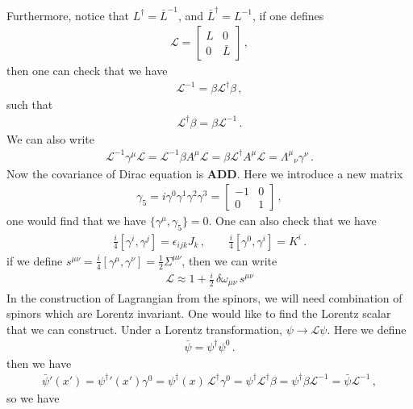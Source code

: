 \documentclass[11pt, onesided]{book}
\theoremstyle{break}
\theoremstyle{break}
\newcommand{\bmat}[1]{\begin{bmatrix} #1 \end{bmatrix}}
\begin{document}
Furthermore, notice that $L^\dagger = \bar{L}^{-1}$, and $\bar{L}^{\dagger} = L^{-1}$, if one defines
\begin{align*}
\mathcal{L} = \bmat{L & 0 \\ 0 & \bar{L}}\,,
\end{align*}
then one can check that we have
\begin{align*}
\mathcal{L}^{-1} = \beta \mathcal{L}^{\dagger} \beta \,,
\end{align*}
such that 
\begin{align*}
\mathcal{L}^{\dagger}\beta = \beta \mathcal{L}^{-1}\,.
\end{align*}
We can also write
\begin{align*}
\mathcal{L}^{-1} \gamma^\mu \mathcal{L} = \mathcal{L}^{-1} \beta A^\mu \mathcal{L} = \beta \mathcal{L}^{\dagger} A^\mu \mathcal{L} = \Lambda^{\mu}{}_{\nu} \gamma^\nu\,.
\end{align*}
Now the covariance of Dirac equation is \textbf{ADD}. Here we introduce a new matrix
\begin{align*}
\gamma_5 = i\gamma^0 \gamma^1 \gamma^2 \gamma^3 = \bmat{-1 & 0 \\ 0 &1}\,,
\end{align*}
one would find that we have $\{\gamma^\mu, \gamma_5\} = 0$. One can also check that we have
\begin{align*}
\frac{i}{4}[\gamma^i, \gamma^j] = \epsilon_{ijk}J_k\,,\qquad
\frac{i}{4}[\gamma^0, \gamma^i] = K^i\,.
\end{align*}
if we define $s^{\mu\nu} = \frac{i}{4}[\gamma^\mu, \gamma^\nu] = \frac{1}{2}\Sigma^{\mu\nu}$, then we can write
\begin{align*}
\mathcal{L} \approx 1 + \frac{i}{2}\, \delta\omega_{\mu\nu}\, s^{\mu\nu}
\end{align*}
In the construction of Lagrangian from the spinors, we will need combination of spinors which are Lorentz invariant. One would like to find the Lorentz scalar that we can construct. Under a Lorentz transformation, $\psi	\to \mathcal{L}\psi$. Here we define 
\begin{align*}
\bar{\psi} = \psi^{\dagger}\psi^0 \,.
\end{align*}
then we have
\begin{align*}
\bar{\psi}'(x') ={\psi^\dagger}'(x') \gamma^0 = \psi^\dagger(x) \, \mathcal{L}^\dagger \gamma^0 = \psi^\dagger \mathcal{L}^\dagger \beta = \psi^\dagger \beta \mathcal{L}^{-1} = \bar{\psi}\mathcal{L}^{-1}\,,
\end{align*}
so we have
\end{document}
